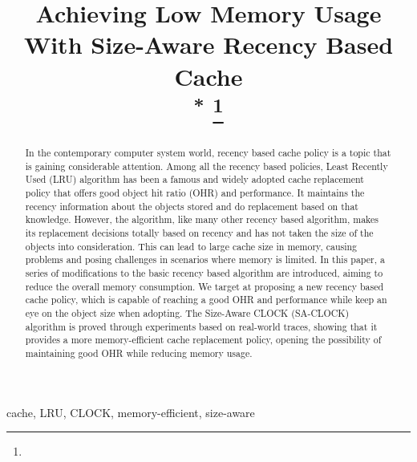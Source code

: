 \documentclass[journal,10.5pt,onecolumn]{IEEEtran}
\begin{document}
\title{Achieving Low Memory Usage With Size-Aware Recency Based Cache\\
{\footnotesize \textsuperscript{*}}
\thanks{}
}

\author{
}

\maketitle

\begin{abstract}
	In the contemporary computer system world, recency based cache policy is a topic that is gaining considerable attention. Among all the recency based policies, Least Recently Used (LRU) algorithm has been a famous and widely adopted cache replacement policy that offers good object hit ratio (OHR) and performance. It maintains the recency information about the objects stored and do replacement based on that knowledge. However, the algorithm, like many other recency based algorithm, makes its replacement decisions totally based on recency and has not taken the size of the objects into consideration. This can lead to large cache size in memory, causing problems and posing challenges in scenarios where memory is limited. In this paper, a series of modifications to the basic recency based algorithm are introduced, aiming to reduce the overall memory consumption. We target at proposing a new recency based cache policy, which is capable of reaching a good OHR and performance while keep an eye on the object size when adopting. The Size-Aware CLOCK (SA-CLOCK) algorithm is proved through experiments based on real-world traces, showing that it provides a more memory-efficient cache replacement policy, opening the possibility of maintaining good OHR while reducing memory usage.
\end{abstract}

\begin{IEEEkeywords}
	cache, LRU, CLOCK, memory-efficient, size-aware
\end{IEEEkeywords}
\end{document}
